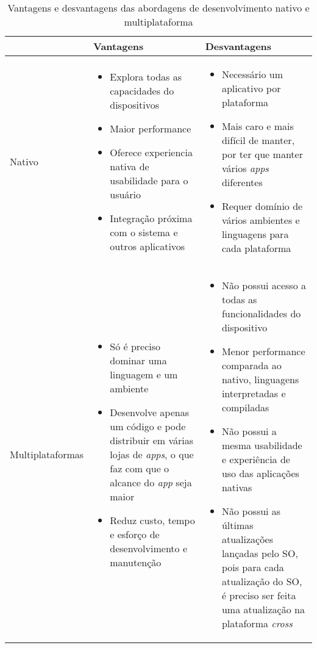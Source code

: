 \begin{table}[h]
	\centering
	{\renewcommand\arraystretch{1.25}
		\begin{tabular}{|l|l|l|} \hline
			& \multicolumn{1}{l|}{Vantagens} & \multicolumn{1}{l|}{Desvantagens}  \\ \hline\hline
			Nativo& 
			\multicolumn{1}{p{6cm}|}{\raggedright 
					\begin{itemize}
						\item Explora todas as capacidades do dispositivos
						\item Maior performance
						\item Oferece experiencia nativa de usabilidade para o usuário
						\item Integração próxima com o sistema e outros aplicativos
					\end{itemize}
				} & 
			\multicolumn{1}{p{6cm}|}{\raggedright 
					\begin{itemize}
						\item Necessário um aplicativo por plataforma
						\item Mais caro e mais difícil de manter, por ter que manter vários \textit{apps} diferentes
						\item Requer domínio de vários ambientes e linguagens para cada plataforma
					\end{itemize}				
				}\\ \hline
			
			Multiplataformas& 
			\multicolumn{1}{p{6cm}|}{\raggedright 
					\begin{itemize}		
						\item Só é preciso dominar uma linguagem e um ambiente
						\item Desenvolve apenas um código e pode distribuir em várias lojas de \textit{apps}, o que faz com que o alcance do \textit{app} seja maior
						\item Reduz custo, tempo e esforço de desenvolvimento e manutenção
					\end{itemize}		
				} & 
			\multicolumn{1}{p{6cm}|}{\raggedright 
					\begin{itemize}		
						\item Não possui acesso a todas as funcionalidades do dispositivo
						\item Menor performance comparada ao nativo, linguagens interpretadas e compiladas
						\item Não possui a mesma usabilidade e experiência de uso das aplicações nativas
						\item Não possui as últimas atualizações lançadas pelo SO, pois para cada atualização do SO, é preciso ser feita uma atualização na plataforma \textit{cross}											
					\end{itemize}												
				}\\ \hline
		\end{tabular}}
	\caption{Vantagens e desvantagens das abordagens de desenvolvimento nativo e multiplataforma }
	\label{tab:vantxdesva}
\end{table}